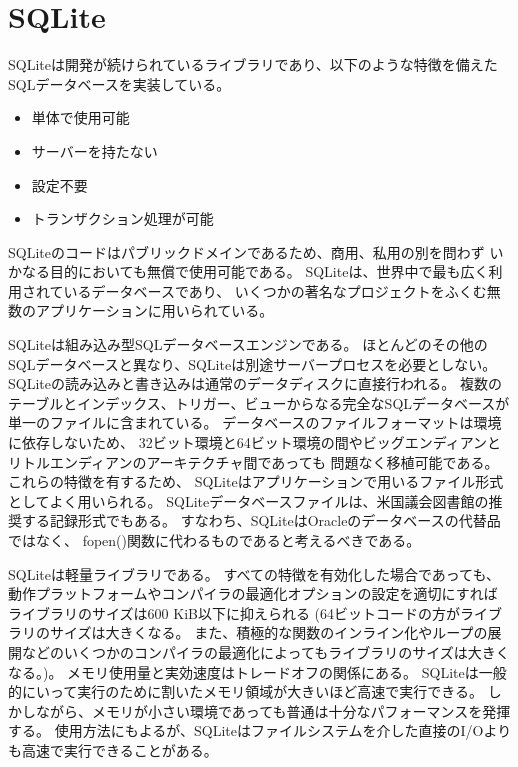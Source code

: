 \documentclass [11pt,a4paper,dvipdfmx] {jarticle}
\begin{document}
\section{SQLite}

SQLiteは開発が続けられているライブラリであり、以下のような特徴を備えたSQLデータベースを実装している。
\begin{itemize}
    \item 単体で使用可能
    \item サーバーを持たない
    \item 設定不要
    \item トランザクション処理が可能
\end{itemize}
SQLiteのコードはパブリックドメインであるため、商用、私用の別を問わず
いかなる目的においても無償で使用可能である。
SQLiteは、世界中で最も広く利用されているデータベースであり、
いくつかの著名なプロジェクトをふくむ無数のアプリケーションに用いられている。

SQLiteは組み込み型SQLデータベースエンジンである。
ほとんどのその他のSQLデータベースと異なり、SQLiteは別途サーバープロセスを必要としない。
SQLiteの読み込みと書き込みは通常のデータディスクに直接行われる。
複数のテーブルとインデックス、トリガー、ビューからなる完全なSQLデータベースが
単一のファイルに含まれている。
データベースのファイルフォーマットは環境に依存しないため、
32ビット環境と64ビット環境の間やビッグエンディアンとリトルエンディアンのアーキテクチャ間であっても
問題なく移植可能である。
これらの特徴を有するため、
SQLiteはアプリケーションで用いるファイル形式としてよく用いられる。
SQLiteデータベースファイルは、米国議会図書館の推奨する記録形式でもある。
すなわち、SQLiteはOracleのデータベースの代替品ではなく、
fopen()関数に代わるものであると考えるべきである。

SQLiteは軽量ライブラリである。
すべての特徴を有効化した場合であっても、
動作プラットフォームやコンパイラの最適化オプションの設定を適切にすれば
ライブラリのサイズは600 KiB以下に抑えられる
 (64ビットコードの方がライブラリのサイズは大きくなる。
 また、積極的な関数のインライン化やループの展開などのいくつかのコンパイラの最適化によってもライブラリのサイズは大きくなる。)。
メモリ使用量と実効速度はトレードオフの関係にある。
SQLiteは一般的にいって実行のために割いたメモリ領域が大きいほど高速で実行できる。
しかしながら、メモリが小さい環境であっても普通は十分なパフォーマンスを発揮する。
使用方法にもよるが、SQLiteはファイルシステムを介した直接のI/Oよりも高速で実行できることがある。
\end{document}

